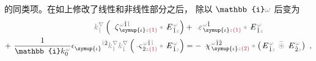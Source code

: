 的同类项。在如上修改了线性和非线性部分之后， 除以 $\mathbb{i} \mathcolor{gray}{\omega}$ 后变为
\begin{subequations}
\begin{align}
	\mathcolor{gray}{k^\nabla_{\check{1}}} \left( \Xint{\begin{smallmatrix} ~ \\ {}^{}_{\mathcolor{gray}{-}} \\ ~ \end{smallmatrix}}{12}{\zeta}^{\;\! \mathcolor{gray}{\omega} \hat{1} \mathcolor{gray}{\check{1}}}_{\;\! \symup{\iota} \mathcolor{gray}{z} \textcolor{Maroon}{(1)}} \mathcolor{gray}{*} \Xint{\mathcolor{gray}{-}}{295}{E}^{\;\!\mathcolor{gray}{\omega}}_{\;\! \hat{1} \mathcolor{gray}{z}} \right) &+ \Xint{\begin{smallmatrix} ~ \\ {}^{}_{\mathcolor{gray}{-}} \\ ~ \end{smallmatrix}}{16}{\varepsilon}^{\;\! \mathcolor{gray}{\omega} \hat{1}}_{\;\! \symup{\iota} \mathcolor{gray}{z} \textcolor{Maroon}{(1)}} \mathcolor{gray}{*} \Xint{\mathcolor{gray}{-}}{295}{E}^{\;\!\mathcolor{gray}{\omega}}_{\;\! \hat{1} \mathcolor{gray}{z}}  \label{eq:nonlinear(2)-wave_wkrho-simplify1} \\ 
	+~ \frac{1}{\mathbb{i} k_0^{\;\! \mathcolor{gray}{\omega}}} \epsilon^{\hphantom{\symup{\iota}}\mathcolor{gray}{\dot{1}}\dot{2}}_{\symup{\iota}} \mathcolor{gray}{k^\nabla_{\dot{1}}} \mathcolor{gray}{k^\nabla_{\check{1}}} \left( \Xint{\begin{smallmatrix} ~ \\ {}^{}_{\mathcolor{gray}{-}} \\ ~ \end{smallmatrix}}{13}{\varsigma}^{\;\! \mathcolor{gray}{\omega} \hat{1} \mathcolor{gray}{\check{1}}}_{\;\! \dot{2} \mathcolor{gray}{z} \textcolor{Maroon}{(1)}} \mathcolor{gray}{*} \Xint{\mathcolor{gray}{-}}{295}{E}^{\;\!\mathcolor{gray}{\omega}}_{\;\! \hat{1} \mathcolor{gray}{z}} \right) &= - ~\Xint{{}^{}_{\mathcolor{gray}{-}}}{23}{\chi}^{\;\! \mathcolor{gray}{\omega} \hat{1} \hat{2}}_{\;\! \symup{\iota} \mathcolor{gray}{z} \textcolor{Maroon}{(2)}} \mathcolor{gray}{*} \left( \Xint{\mathcolor{gray}{-}}{295}{E}^{\;\!\mathcolor{gray}{\omega}}_{\;\! \hat{1} \mathcolor{gray}{z}} ~\mathcolor{gray}{\widetilde \circledast}~ \Xint{\mathcolor{gray}{-}}{295}{E}^{\;\!\mathcolor{gray}{\omega}}_{\;\! \hat{2} \mathcolor{gray}{z}} \right)~, \label{eq:nonlinear(2)-wave_wkrho-simplify1-2}
\end{align}
\end{subequations}
